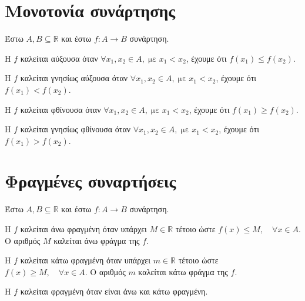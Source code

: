 \documentclass[a4paper,table]{report}
\begin{document}
\section{Μονοτονία συνάρτησης}

\begin{dfn}
  Έστω $ A, B \subseteq \mathbb{R} $ και έστω $ f \colon A \to B $ συνάρτηση. 
  \begin{myitemize}
    \item Η $f$ καλείται \textcolor{Col1}{αύξουσα} όταν 
      $ \forall x_{1}, x_{2} \in A, \; \text{με} \; x_{1} < x_{2} $, έχουμε ότι 
      $ f(x_{1}) \leq f(x_{2}) $.
    \item Η $f$ καλείται \textcolor{Col1}{γνησίως αύξουσα} όταν 
      $ \forall x_{1}, x_{2} \in A, \; \text{με} \; x_{1} < x_{2} $, έχουμε ότι 
      $ f(x_{1}) < f(x_{2}) $.
    \item Η $f$ καλείται \textcolor{Col1}{φθίνουσα} όταν 
      $ \forall x_{1}, x_{2} \in A, \; \text{με} \; x_{1} < x_{2} $, έχουμε ότι 
      $ f(x_{1}) \geq f(x_{2}) $.
    \item Η $f$ καλείται \textcolor{Col1}{γνησίως φθίνουσα} όταν 
      $ \forall x_{1}, x_{2} \in A, \; \text{με} \; x_{1} < x_{2} $, έχουμε ότι 
      $ f(x_{1}) > f(x_{2}) $.
  \end{myitemize}
\end{dfn}

\section{Φραγμένες συναρτήσεις}

\begin{dfn}
  Έστω $ A, B \subseteq \mathbb{R} $ και έστω $ f \colon A \to B $ συνάρτηση. 
  \begin{myitemize}
    \item Η $f$ καλείται \textcolor{Col1}{άνω φραγμένη} όταν υπάρχει $ M \in \mathbb{R} $ τέτοιο ώστε 
      $ f(x) \leq M, \quad \forall x \in A $. Ο αριθμός $M$ καλείται
      \textcolor{Col1}{άνω φράγμα} της $f$.
    \item Η $f$ καλείται \textcolor{Col1}{κάτω φραγμένη} όταν υπάρχει $ m \in \mathbb{R} $ τέτοιο ώστε 
      $ f(x) \geq M, \quad \forall x \in A $. Ο αριθμός $m$ καλείται
      \textcolor{Col1}{κάτω φράγμα} της $f$.
    \item Η $f$ καλείται \textcolor{Col1}{φραγμένη} όταν είναι άνω και κάτω φραγμένη.
  \end{myitemize}
\end{dfn}
\end{document}
